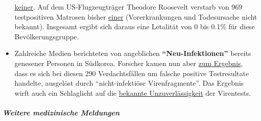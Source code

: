\begin{itemize}
  \href{https://en.wikipedia.org/wiki/COVID-19_pandemic_on_Charles_de_Gaulle}{keiner}.
  Auf dem US-Flugzeugträger Theodore Roosevelt verstarb von 969
  testpositiven Matrosen bisher
  \href{https://en.wikipedia.org/wiki/COVID-19_pandemic_on_USS_Theodore_Roosevelt}{einer}
  (Vorerkrankungen und Todesursache nicht bekannt). Insgesamt ergibt
  sich daraus eine Letalität von 0 bis 0.1\% für diese
  Bevölkerungsgruppe.
\item
  Zahlreiche Medien berichteten von angeblichen
  \textbf{``Neu-Infektionen''} bereits genesener Personen in Südkorea.
  Forscher kamen nun aber
  \href{https://www.independent.co.uk/news/world/asia/coronavirus-south-korea-patients-infected-twice-test-a9491986.html}{zum
  Ergebnis}, dass es sich bei diesen 290 Verdachtsfällen um falsche
  positive Testresultate handelte, ausgelöst durch ``nicht-infektiöse
  Virenfragmente''. Das Ergebnis wirft auch ein Schlaglicht auf die
  \href{https://www.ncbi.nlm.nih.gov/pubmed/32219885}{bekannte
  Unzuverlässigkeit} der Virentests.
\end{itemize}

\hypertarget{weitere-medizinische-meldungen}{%
\subparagraph{\texorpdfstring{\textbf{Weitere medizinische
Meldungen}}{Weitere medizinische Meldungen}}\label{weitere-medizinische-meldungen}}

